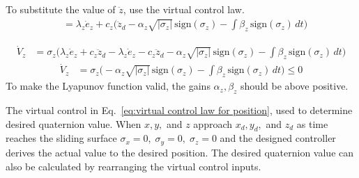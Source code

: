 \begin{small}
\begin{enumerate}
To substitute the value of $\ddot{z}$, use the virtual control law.
\begin{equation}
\begin{align*}
&= \lambda_z \dot{e}_z + c_z \Big(\ddot{z}_d - \alpha_z \sqrt{|\sigma_z|}\,\text{sign}(\sigma_z) 
   - \int \beta_z \,\text{sign}(\sigma_z)\, dt \Big)
\end{align*}
\end{equation}

\begin{equation}
\begin{align}
\dot{V}_z &= \sigma_z \Big(\lambda_z \dot{e}_z + c_z \ddot{z}_d - \lambda_z \dot{e}_z 
   - c_z \ddot{z}_d - \alpha_z \sqrt{|\sigma_z|}\,\text{sign}(\sigma_z) 
   - \int \beta_z \,\text{sign}(\sigma_z)\, dt \Big) \label{4.14} %
\end{align}
\end{equation}
\begin{equation}
\begin{align*}
\dot{V}_z &= \sigma_z \Big(-\alpha_z \sqrt{|\sigma_z|}\,\text{sign}(\sigma_z) 
   - \int \beta_z \,\text{sign}(\sigma_z)\, dt \Big) \leq 0
\end{align*}
\end{equation}
To make the Lyapunov function valid, the gains $\alpha_z, \beta_z$ should be above positive.


The virtual control in Eq.~\ref{eq:virtual control law for position}, used to determine desired quaternion value. 
When $x, y,$ and $z$ approach $x_d, y_d,$ and $z_d$ as time reaches the sliding surface 
$\sigma_x = 0, \; \sigma_y = 0, \; \sigma_z = 0$ and the designed controller derives the actual value 
to the desired position. The desired quaternion value can also be calculated by rearranging 
the virtual control inputs.




\end{enumerate}
\end{small}
